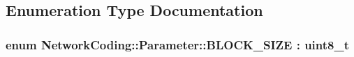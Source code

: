 \subsection{Enumeration Type Documentation}
\subsubsection[{\texorpdfstring{B\+L\+O\+C\+K\+\_\+\+S\+I\+ZE}{BLOCK_SIZE}}]{\setlength{\rightskip}{0pt plus 5cm}enum {\bf Network\+Coding\+::\+Parameter\+::\+B\+L\+O\+C\+K\+\_\+\+S\+I\+ZE} \+: uint8\+\_\+t}\hypertarget{namespace_network_coding_1_1_parameter_a28b92ccd4fb04190653869f4438eee1f}{}\label{namespace_network_coding_1_1_parameter_a28b92ccd4fb04190653869f4438eee1f}
